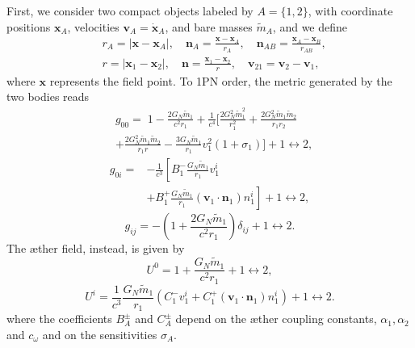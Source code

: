 \documentclass[
    floats,
    floatfix,
    amssymb,
    prd,
    twocolumn,
    superscriptaddress,
    nofootinbib,
    unicode,
    colorlinks=true,
    linktocpage=true
]{revtex4-2}
\begin{document}
First, we consider two compact objects labeled by $A=\{1,2\}$, with coordinate positions $\mathbf{x}_A$, velocities $\mathbf{v}_A=\dot{\mathbf{x}}_A$, and bare masses $\tilde m_A$, and we define
\begin{align}
&r_A = |\mathbf{x}-\mathbf{x}_A|, \quad
\mathbf{n}_A=\frac{\mathbf{x}-\mathbf{x}_A}{r_A},\quad
\mathbf n_{AB}=\frac{\mathbf x_A-\mathbf x_B}{r_{AB}}, \nonumber \\
&r=|\mathbf{x}_1-\mathbf{x}_2|, \quad
\mathbf{n}=\frac{\mathbf{x}_1-\mathbf{x}_2}{r}, \quad
\mathbf{v}_{21}=\mathbf{v}_2-\mathbf{v}_1,
\end{align}
where $\mathbf{x}$ represents the field point. To 1PN order, the metric generated by the two bodies reads
\begin{align}
&g_{00} =\; 1
-\frac{2G_N\tilde m_1}{c^2 r_1} +\frac{1}{c^4}\Bigg[
\frac{2G_N^2\tilde m_1^2}{r_1^2} +\frac{2G_N^2\tilde m_1\tilde m_2}{r_1 r_2} \nonumber\\
&
+\frac{2G_N^2\tilde m_1\tilde m_2}{r_1 r}
-\frac{3G_N\tilde m_1}{r_1}v_1^2(1+\sigma_1)
\Bigg]
+1\leftrightarrow2 ,
\label{eq:g00_1PN}
\end{align}
\begin{align}
g_{0i}
=
&-\frac{1}{c^3}\left[
B_1^-\frac{G_N\tilde m_1}{r_1}v_1^i\right.\nonumber\\
&\left.+B_1^+\frac{G_N\tilde m_1}{r_1}
(\mathbf v_1\!\cdot\!\mathbf n_1)n_1^i
\right]
+1\leftrightarrow2 ,
\label{eq:g0i_1PN}
\end{align}
\begin{equation}
g_{ij}
=
-\left(1+\frac{2G_N\tilde m_1}{c^2 r_1}\right)\delta_{ij}
+1\leftrightarrow2 .
\label{eq:gij_1PN}
\end{equation}
The \ae ther field, instead, is given by
\begin{equation}
U^0 = 1 + \frac{G_N\tilde m_1}{c^2 r_1} + 1\leftrightarrow2,
\end{equation}
\begin{equation}
U^i
=\frac{1}{c^3}\frac{G_N\tilde m_1}{r_1}
\left(
C_1^- v_1^i
+ C_1^+ (\mathbf v_1\!\cdot\!\mathbf n_1)n_1^i
\right)
+1\leftrightarrow2 .
\end{equation}
where the coefficients $B_A^\pm$ and $C_A^\pm$ depend on the \ae ther coupling constants, $\alpha_1,\alpha_2$ and $c_\omega$ and on the sensitivities $\sigma_A$. 
\end{document}
